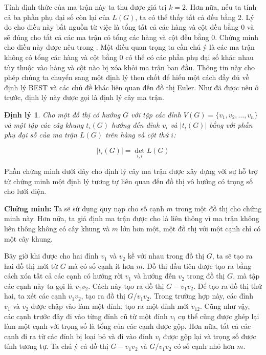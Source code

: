 \documentclass[14pt, a4paper]{article}
\numberwithin{equation}{section}
\numberwithin{figure}{section}
\newtheorem{dl}{Định lý}
\numberwithin{dl}{section}
\numberwithin{md}{section}
\numberwithin{bd}{section}
\numberwithin{dn}{section}
\numberwithin{hq}{section}
\begin{document}
    Tính định thức của ma trận này ta thu được giá trị $k=2$.
    Hơn nữa, nếu ta tính cả ba phần phụ đại số còn lại của $L(G)$, ta có thể thấy tất cả đều bằng 2.
    Lý do cho điều này bắt nguồn từ việc là tổng tất cả các hàng và cột đều bằng 0 và sẽ đúng cho tất cả các ma trận có tổng các hàng và cột đều bằng 0.
    Chứng minh cho điều này được nêu trong \cite{fleischner1990eulerian}.
    Một điều quan trọng ta cần chú ý là các ma trận không có tổng các hàng và cột bằng 0 có thể có các phần phụ đại số khác nhau tùy thuộc vào hàng và cột nào bị xóa khỏi ma trận ban đầu.
    Thông tin này cho phép chúng ta chuyển sang một định lý then chốt để hiểu một cách đầy đủ về định lý BEST và các chủ đề khác liên quan đến đồ thị Euler.
    Như đã được nêu ở trước, định lý này được gọi là định lý cây ma trận.

    \begin{dl}
        Cho một đồ thị có hướng $G$ với tập các đỉnh $V(G)=\lbrace v_1, v_2, \dots, v_n \rbrace$ và một tập các cây khung $t_i (G)$ hướng đến đỉnh $v_i$ và $\lvert t_i(G) \rvert$ bằng với phần phụ đại số của ma trận $L(G)$ trên hàng và cột thứ $i$:

        \begin{equation*}
            \lvert t_i(G) \rvert = \det_{i, i} L(G)
        \end{equation*}
    \end{dl}

    Phần chứng minh dưới đây cho định lý cây ma trận được xây dựng với sự hỗ trợ từ \cite{bollobas1998graduate} chứng minh một định lý tương tự liên quan đến đồ thị vô hướng có trọng số cho lưới điện.

    \textbf{Chứng minh:}
    Ta sẽ sử dụng quy nạp cho số cạnh $m$ trong một đồ thị cho chứng minh này.
    Hơn nữa, ta giả định ma trận được cho là liên thông vì ma trận không liên thông không có cây khung và $m$ lớn hơn một, một đồ thị với một cạnh chỉ có một cây khung.

    Bây giờ khi được cho hai đỉnh $v_1$ và $v_2$ kề với nhau trong đồ thị $G$, ta sẽ tạo ra hai đồ thị mới từ $G$ mà có số cạnh ít hơn $m$.
    Đồ thị đầu tiên được tạo ra bằng cách xóa tất cả các cạnh có hướng rời $v_1$ và hướng đến $v_2$ trong đồ thị $G$, mà tập các cạnh này ta gọi là $v_1 v_2$.
    Cách này tạo ra đồ thị $G - v_1 v_2$.
    Để tạo ra đồ thị thứ hai, ta xét các cạnh $v_1 v_2$, tạo ra đồ thị $G / v_1 v_2$.
    Trong trường hợp này, các đỉnh $v_1$ và $v_2$ được chập vào làm một đỉnh, tạo ra một đỉnh mới $v_{12}$.
    Cũng như vậy, các cạnh trước đây đi vào từng đỉnh cũ từ một đỉnh $v_i$ cụ thể cũng được ghép lại làm một cạnh với trọng số là tổng của các cạnh được gộp.
    Hơn nữa, tất cả các cạnh đi ra từ các đỉnh bị loại bỏ và đi vào đỉnh $v_i$ được gộp lại và trọng số được tính tương tự.
    Ta chú ý cả đồ thị $G - v_1 v_2$ và $G / v_1 v_2$ có số cạnh nhỏ hơn $m$.
\end{document}
